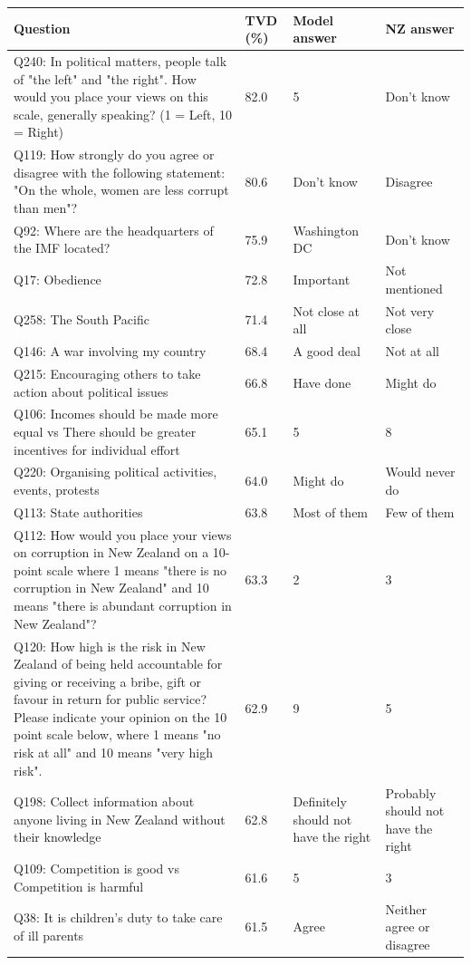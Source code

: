 \begin{tabular}{p{3.1in}lp{1.05in}p{1.05in}}
\toprule
Question & TVD (\%) & Model answer & NZ answer \\
\midrule
Q240: In political matters, people talk of "the left" and "the right". How would you place your views on this scale, generally speaking? (1 = Left, 10 = Right) & 82.0 & 5 & Don't know \\
Q119: How strongly do you agree or disagree with the following statement: "On the whole, women are less corrupt than men"? & 80.6 & Don't know & Disagree \\
Q92: Where are the headquarters of the IMF located? & 75.9 & Washington DC & Don't know \\
Q17: Obedience & 72.8 & Important & Not mentioned \\
Q258: The South Pacific & 71.4 & Not close at all & Not very close \\
Q146: A war involving my country & 68.4 & A good deal & Not at all \\
Q215: Encouraging others to take action about political issues & 66.8 & Have done & Might do \\
Q106: Incomes should be made more equal vs There should be greater incentives for individual effort & 65.1 & 5 & 8 \\
Q220: Organising political activities, events, protests & 64.0 & Might do & Would never do \\
Q113: State authorities & 63.8 & Most of them & Few of them \\
Q112: How would you place your views on corruption in New Zealand on a 10-point scale where 1 means "there is no corruption in New Zealand" and 10 means "there is abundant corruption in New Zealand"? & 63.3 & 2 & 3 \\
Q120: How high is the risk in New Zealand of being held accountable for giving or receiving a bribe, gift or favour in return for public service? Please indicate your opinion on the 10 point scale below, where 1 means "no risk at all" and 10 means "very high risk". & 62.9 & 9 & 5 \\
Q198: Collect information about anyone living in New Zealand without their knowledge & 62.8 & Definitely should not have the right & Probably should not have the right \\
Q109: Competition is good vs Competition is harmful & 61.6 & 5 & 3 \\
Q38: It is children's duty to take care of ill parents & 61.5 & Agree & Neither agree or disagree \\

\end{tabular}
